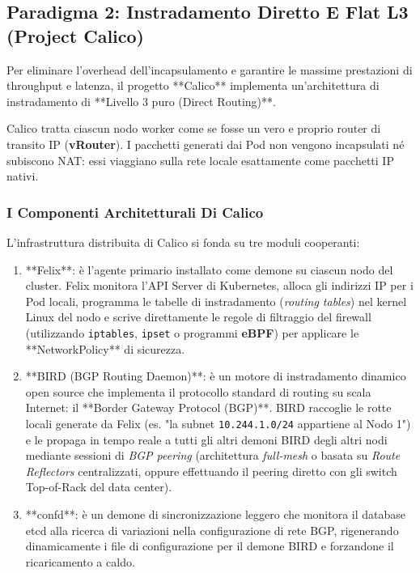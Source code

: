 \documentclass[11pt, a4paper]{article}
\begin{document}
\subsection{Paradigma 2: Instradamento Diretto E Flat L3 (Project Calico)}

Per eliminare l'overhead dell'incapsulamento e garantire le massime prestazioni di throughput e latenza, il progetto **Calico** implementa un'architettura di instradamento di **Livello 3 puro (Direct Routing)**.

Calico tratta ciascun nodo worker come se fosse un vero e proprio router di transito IP (\textbf{vRouter}). I pacchetti generati dai Pod non vengono incapsulati né subiscono NAT: essi viaggiano sulla rete locale esattamente come pacchetti IP nativi.

\subsubsection{I Componenti Architetturali Di Calico}
L'infrastruttura distribuita di Calico si fonda su tre moduli cooperanti:
\begin{enumerate}
    \item **Felix**: è l'agente primario installato come demone su ciascun nodo del cluster. Felix monitora l'API Server di Kubernetes, alloca gli indirizzi IP per i Pod locali, programma le tabelle di instradamento (\emph{routing tables}) nel kernel Linux del nodo e scrive direttamente le regole di filtraggio del firewall (utilizzando \texttt{iptables}, \texttt{ipset} o programmi \textbf{eBPF}) per applicare le **NetworkPolicy** di sicurezza.
    \item **BIRD (BGP Routing Daemon)**: è un motore di instradamento dinamico open source che implementa il protocollo standard di routing su scala Internet: il **Border Gateway Protocol (BGP)**. BIRD raccoglie le rotte locali generate da Felix (es. "la subnet \texttt{10.244.1.0/24} appartiene al Nodo 1") e le propaga in tempo reale a tutti gli altri demoni BIRD degli altri nodi mediante sessioni di \emph{BGP peering} (architettura \emph{full-mesh} o basata su \emph{Route Reflectors} centralizzati, oppure effettuando il peering diretto con gli switch Top-of-Rack del data center).
    \item **confd**: è un demone di sincronizzazione leggero che monitora il database etcd alla ricerca di variazioni nella configurazione di rete BGP, rigenerando dinamicamente i file di configurazione per il demone BIRD e forzandone il ricaricamento a caldo.
\end{enumerate}
\end{document}
